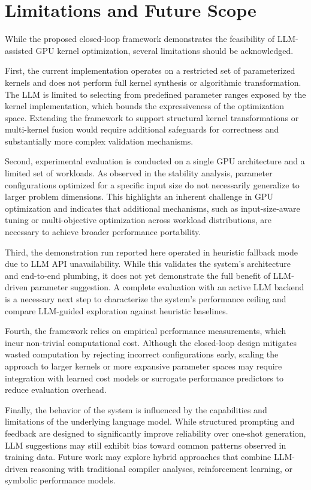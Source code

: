 \documentclass{article}
\begin{document}
\section{Limitations and Future Scope}

While the proposed closed-loop framework demonstrates the feasibility of LLM-assisted GPU kernel optimization, several limitations should be acknowledged.

First, the current implementation operates on a restricted set of parameterized kernels and does not perform full kernel synthesis or algorithmic transformation. The LLM is limited to selecting from predefined parameter ranges exposed by the kernel implementation, which bounds the expressiveness of the optimization space. Extending the framework to support structural kernel transformations or multi-kernel fusion would require additional safeguards for correctness and substantially more complex validation mechanisms.

Second, experimental evaluation is conducted on a single GPU architecture and a limited set of workloads. As observed in the stability analysis, parameter configurations optimized for a specific input size do not necessarily generalize to larger problem dimensions. This highlights an inherent challenge in GPU optimization and indicates that additional mechanisms, such as input-size-aware tuning or multi-objective optimization across workload distributions, are necessary to achieve broader performance portability.

Third, the demonstration run reported here operated in heuristic fallback mode due to LLM API unavailability. While this validates the system's architecture and end-to-end plumbing, it does not yet demonstrate the full benefit of LLM-driven parameter suggestion. A complete evaluation with an active LLM backend is a necessary next step to characterize the system's performance ceiling and compare LLM-guided exploration against heuristic baselines.

Fourth, the framework relies on empirical performance measurements, which incur non-trivial computational cost. Although the closed-loop design mitigates wasted computation by rejecting incorrect configurations early, scaling the approach to larger kernels or more expansive parameter spaces may require integration with learned cost models or surrogate performance predictors to reduce evaluation overhead.

Finally, the behavior of the system is influenced by the capabilities and limitations of the underlying language model. While structured prompting and feedback are designed to significantly improve reliability over one-shot generation, LLM suggestions may still exhibit bias toward common patterns observed in training data. Future work may explore hybrid approaches that combine LLM-driven reasoning with traditional compiler analyses, reinforcement learning, or symbolic performance models.
\end{document}
